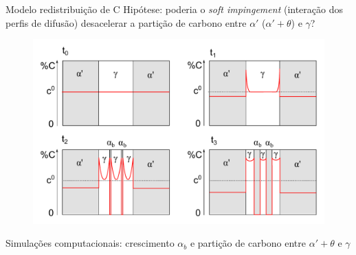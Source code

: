\begin{frame}{Modelo redistribuição de C}
  Hipótese: poderia o \textit{soft impingement} (interação dos perfis de difusão) desacelerar a partição de carbono entre $\alpha'$ ($\alpha' + \theta$) e $\gamma$?

  \begin{figure}
    \includegraphics[width=.8\textwidth]{img/C_profiles.pdf}
  \end{figure}

  Simulações computacionais: crescimento $\alpha_b$ e partição de carbono entre $\alpha' + \theta$ e $\gamma$
\end{frame}

